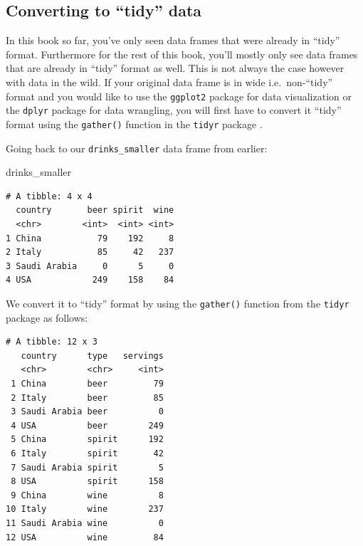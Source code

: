 \documentclass[12pt, krantz2,]{krantz}
\makeatletter
\newenvironment{Shaded}{\begin{snugshade}}{\end{snugshade}}
\newcommand{\DataTypeTok}[1]{\textcolor[rgb]{0.27,0.27,0.27}{#1}}
\newcommand{\KeywordTok}[1]{\textcolor[rgb]{0.27,0.27,0.27}{\textbf{#1}}}
\newcommand{\NormalTok}[1]{#1}
\newcommand{\OperatorTok}[1]{\textcolor[rgb]{0.43,0.43,0.43}{\textbf{#1}}}
\newcommand{\StringTok}[1]{\textcolor[rgb]{0.5,0.5,0.5}{#1}}
\newenvironment{kframe}{%
\medskip{}
\setlength{\fboxsep}{.8em}
 \def\at@end@of@kframe{}%
 \ifinner\ifhmode%
  \def\at@end@of@kframe{\end{minipage}}%
  \begin{minipage}{\columnwidth}%
 \fi\fi%
 \def\FrameCommand##1{\hskip\@totalleftmargin \hskip-\fboxsep
 \colorbox{shadecolor}{##1}\hskip-\fboxsep
     \hskip-\linewidth \hskip-\@totalleftmargin \hskip\columnwidth}%
 \MakeFramed {\advance\hsize-\width
   \@totalleftmargin\z@ \linewidth\hsize
   \@setminipage}}%
 {\par\unskip\endMakeFramed%
 \at@end@of@kframe}
\renewenvironment{Shaded}{\begin{kframe}}{\end{kframe}}
\makeatother
\begin{document}
\hypertarget{converting-to-tidy-data}{%
\subsection{Converting to ``tidy'' data}\label{converting-to-tidy-data}}

In this book so far, you've only seen data frames that were already in ``tidy'' format. Furthermore for the rest of this book, you'll mostly only see data frames that are already in ``tidy'' format as well. This is not always the case however with data in the wild. If your original data frame is in wide i.e.~non-``tidy'' format and you would like to use the \texttt{ggplot2} package for data visualization or the \texttt{dplyr} package for data wrangling, you will first have to convert it ``tidy'' format using the \texttt{gather()} function in the \texttt{tidyr} package \citep{R-tidyr}.

Going back to our \texttt{drinks\_smaller} data frame from earlier:

\begin{Shaded}
\begin{Highlighting}[]
\NormalTok{drinks_smaller}
\end{Highlighting}
\end{Shaded}

\begin{verbatim}
# A tibble: 4 x 4
  country       beer spirit  wine
  <chr>        <int>  <int> <int>
1 China           79    192     8
2 Italy           85     42   237
3 Saudi Arabia     0      5     0
4 USA            249    158    84
\end{verbatim}

We convert it to ``tidy'' format by using the \texttt{gather()} function from the \texttt{tidyr} package as follows:

\begin{Shaded}
\end{Shaded}

\begin{verbatim}
# A tibble: 12 x 3
   country      type   servings
   <chr>        <chr>     <int>
 1 China        beer         79
 2 Italy        beer         85
 3 Saudi Arabia beer          0
 4 USA          beer        249
 5 China        spirit      192
 6 Italy        spirit       42
 7 Saudi Arabia spirit        5
 8 USA          spirit      158
 9 China        wine          8
10 Italy        wine        237
11 Saudi Arabia wine          0
12 USA          wine         84
\end{verbatim}
\end{document}
